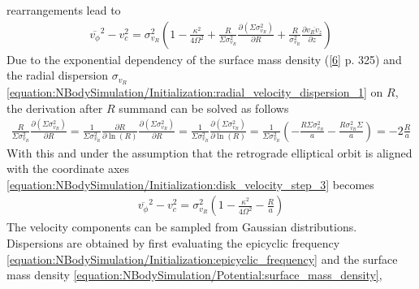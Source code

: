 \documentclass[letterpaper,10pt,english]{sphinxmanual}
\begin{document}
					\sphinxAtStartPar
					rearrangements lead to
					\begin{equation}\label{equation:NBodySimulation/Initialization:disk_velocity_step_3}
					\begin{split}\overline{v_\phi}^2 - v_c^2 = \sigma_{v_{R}}^2
					\left (
					1 - \frac{\kappa^2}{4\Omega^2} +
					\frac{R}{\Sigma \sigma_{v_{R}}^2 } \frac{\partial \left ( \Sigma \sigma_{v_{R}}^2 \right ) }{\partial R}
					+ \frac{R}{\sigma_{v_{R}}^2} \frac{\partial \overline{v_Rv_z}}{\partial z}
					\right )\end{split}
					\end{equation}
					\sphinxAtStartPar
					Due to the exponential dependency of the surface mass density ({[}\hyperlink{cite.NBodySimulation/Appendix:id17}{6}{]} p. 325)
					and the radial dispersion \(\sigma_{v_{R}}\) \eqref{equation:NBodySimulation/Initialization:radial_velocity_dispersion_1} on \(R\), the derivation after \(R\) summand can be solved as follows
					\begin{equation*}
					\begin{split}\frac{R}{\Sigma \sigma_{v_{R}}^2 } \frac{\partial \left ( \Sigma \sigma_{v_{R}}^2 \right ) }{\partial R} =
					\frac{1}{\Sigma \sigma_{v_{R}}^2 } \frac{\partial R }{\partial \ln(R)}\frac{\partial \left ( \Sigma \sigma_{v_{R}}^2 \right ) }{\partial R} =
					\frac{1}{\Sigma \sigma_{v_{R}}^2 } \frac{\partial \left ( \Sigma \sigma_{v_{R}}^2 \right ) }{\partial \ln(R)} =
					\frac{1}{\Sigma \sigma_{v_{R}}^2 }
					\left ( - \frac{R\Sigma\sigma_{v_{R}}^2}{a}
					- \frac{R\sigma_{v_{R}}^2\Sigma}{a}
					\right ) = - 2 \frac{R}{a}\end{split}
					\end{equation*}
					\sphinxAtStartPar
					With this and under the assumption that the retrograde elliptical orbit is aligned with the coordinate axes \eqref{equation:NBodySimulation/Initialization:disk_velocity_step_3} becomes
					\begin{equation}\label{equation:NBodySimulation/Initialization:disk_velocity_step_4}
					\begin{split}\overline{v_\phi}^2 - v_c^2 = \sigma_{v_{R}}^2
					\left (1 - \frac{\kappa^2}{4\Omega^2} -\frac{R}{a } \right )\end{split}
					\end{equation}
					\sphinxAtStartPar
					The velocity components can be sampled from Gaussian distributions. Dispersions are obtained by first evaluating the epicyclic frequency \eqref{equation:NBodySimulation/Initialization:epicyclic_frequency} and the surface mass density \eqref{equation:NBodySimulation/Potential:surface_mass_density},
\end{document}
